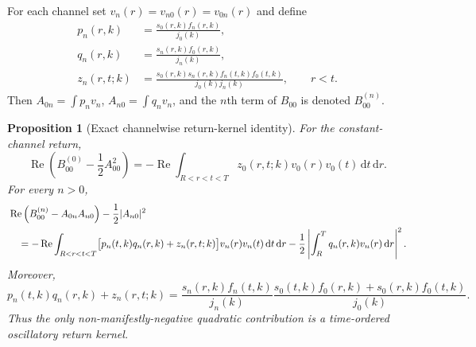 \documentclass[11pt]{article}
\newcommand{\dd}{\,\mathrm d}
\DeclareMathOperator{\Rea}{Re}
\newtheorem{proposition}{Proposition}[section]
\theoremstyle{definition}
\begin{document}
For each channel set $v_n(r)=v_{n0}(r)=v_{0n}(r)$ and define
\begin{align}
 p_n(r,k)&=\frac{s_0(r,k)f_n(r,k)}{j_0(k)},\label{eq:p}\\
 q_n(r,k)&=\frac{s_n(r,k)f_0(r,k)}{j_n(k)},\label{eq:q}\\
 z_n(r,t;k)&=\frac{s_0(r,k)s_n(r,k)f_n(t,k)f_0(t,k)}{j_0(k)j_n(k)},
 \qquad r<t.
 \label{eq:z}
\end{align}
Then $A_{0n}=\int p_nv_n$, $A_{n0}=\int q_nv_n$, and the $n$th term of $B_{00}$ is denoted $B_{00}^{(n)}$.

\begin{proposition}[Exact channelwise return-kernel identity]
\label{prop:return-kernel}
For the constant-channel return,
\begin{equation}
 \Rea\left(B_{00}^{(0)}-\frac12A_{00}^2\right)
 =-\Rea\int_{R<r<t<T}z_0(r,t;k)v_0(r)v_0(t)\dd t\dd r.
 \label{eq:Q0-return}
\end{equation}
For every $n>0$,
\begin{align}
 &\Rea\left(B_{00}^{(n)}-A_{0n}A_{n0}\right)
 -\frac12|A_{n0}|^2\notag\\
 &\quad=-\Rea\int_{R<r<t<T}
 \bigl[p_n(t,k)q_n(r,k)+z_n(r,t;k)\bigr]
 v_n(r)v_n(t)\dd t\dd r
 -\frac12\left|\int_R^Tq_n(r,k)v_n(r)\dd r\right|^2.
 \label{eq:Qn-return}
\end{align}
Moreover,
\begin{equation}
 p_n(t,k)q_n(r,k)+z_n(r,t;k)
 =\frac{s_n(r,k)f_n(t,k)}{j_n(k)}
  \frac{s_0(t,k)f_0(r,k)+s_0(r,k)f_0(t,k)}{j_0(k)}.
 \label{eq:return-factor}
\end{equation}
Thus the only non-manifestly-negative quadratic contribution is a time-ordered oscillatory return kernel.
\end{proposition}
\end{document}
